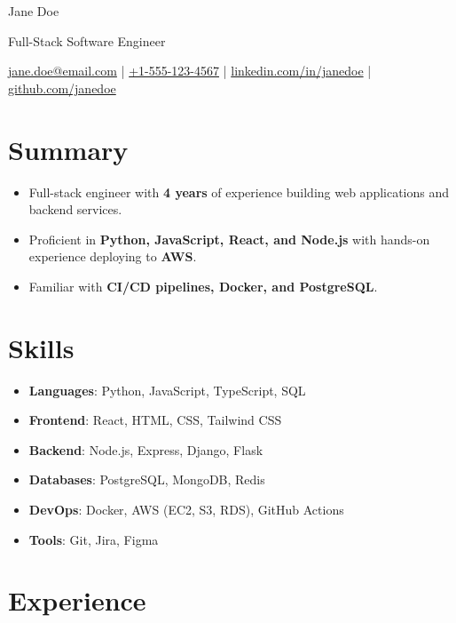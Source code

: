 \documentclass[11pt]{article}
\begin{document}
\centerline{\Huge Jane Doe}
\centerline{\Large Full-Stack Software Engineer}
\vspace{4pt}
\centerline{
  \href{mailto:jane.doe@email.com}{jane.doe@email.com} | \href{tel:+15551234567}{+1-555-123-4567} | \href{https://www.linkedin.com/in/janedoe}{linkedin.com/in/janedoe} | \href{https://github.com/janedoe}{github.com/janedoe}
}

\section*{Summary}

\begin{itemize}
  \item Full-stack engineer with \textbf{4 years} of experience building web applications and backend services. \\
  \item Proficient in \textbf{Python, JavaScript, React, and Node.js} with hands-on experience deploying to \textbf{AWS}. \\
  \item Familiar with \textbf{CI/CD pipelines, Docker, and PostgreSQL}. \\
\end{itemize}

\section*{Skills}

\begin{itemize}
  \item \textbf{Languages}: Python, JavaScript, TypeScript, SQL \\
  \item \textbf{Frontend}: React, HTML, CSS, Tailwind CSS \\
  \item \textbf{Backend}: Node.js, Express, Django, Flask \\
  \item \textbf{Databases}: PostgreSQL, MongoDB, Redis \\
  \item \textbf{DevOps}: Docker, AWS (EC2, S3, RDS), GitHub Actions \\
  \item \textbf{Tools}: Git, Jira, Figma \\
\end{itemize}

\section*{Experience}
\end{document}
